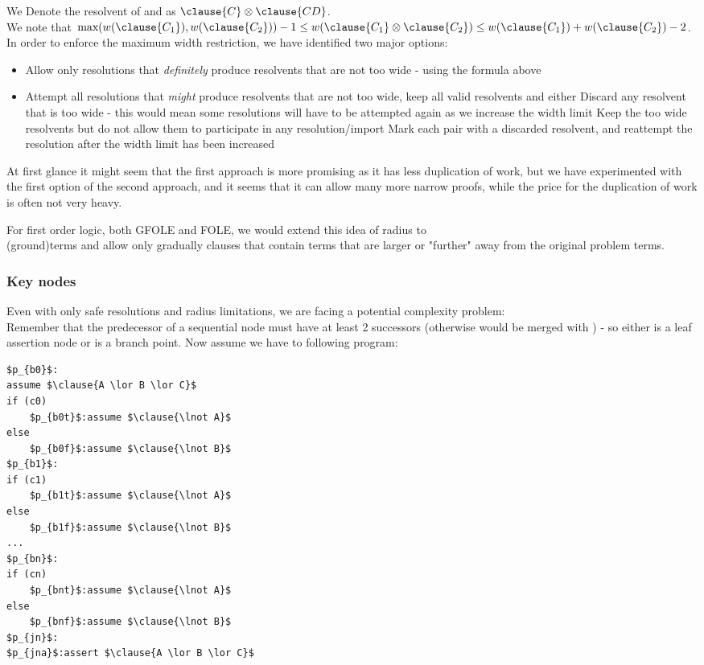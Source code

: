 \noindent
We Denote the resolvent of  and  as $\clause{C} \otimes \clause{CD}$. \\
We note that $\textrm{max}(w(\clause{C_1}),w(\clause{C_2}))-1 \leq w(\clause{C_1} \otimes \clause{C_2}) \leq w(\clause{C_1})+w(\clause{C_2})-2$.\\
In order to enforce the maximum width restriction, we have identified two major options:
\begin{itemize}
	\item Allow only resolutions that \emph{definitely} produce resolvents that are not too wide - using the formula above
	\item Attempt all resolutions that \emph{might} produce resolvents that are not too wide, keep all valid resolvents and either
		\subitem Discard any resolvent that is too wide - this would mean some resolutions will have to be attempted again as we increase the width limit
		\subitem Keep the too wide resolvents but do not allow them to participate in any resolution/import
		\subitem Mark each pair with a discarded resolvent, and reattempt the resolution after the width limit has been increased
\end{itemize}

At first glance it might seem that the first approach is more promising as it has less duplication of work, but we have experimented with the first option of the second approach, and it seems that it can allow many more narrow proofs, while the price for the duplication of work is often not very heavy.

For first order logic, both GFOLE and FOLE, we would extend this idea of radius to \\
(ground)terms and allow only gradually clauses that contain terms that are larger or "further" away from the original problem terms.

\subsubsection{Key nodes}
Even with only safe resolutions and radius limitations, we are facing a potential complexity problem:\\
Remember that the predecessor  of a sequential node  must have at least 2 successors (otherwise  would be merged with ) - so either  is a leaf assertion node or  is a branch point.
Now assume we have to following program:
\begin{lstlisting}[mathescape]
$p_{b0}$: 
assume $\clause{A \lor B \lor C}$
if (c0)
	$p_{b0t}$:assume $\clause{\lnot A}$
else
	$p_{b0f}$:assume $\clause{\lnot B}$
$p_{b1}$: 
if (c1)
	$p_{b1t}$:assume $\clause{\lnot A}$
else
	$p_{b1f}$:assume $\clause{\lnot B}$
...
$p_{bn}$: 
if (cn)
	$p_{bnt}$:assume $\clause{\lnot A}$
else
	$p_{bnf}$:assume $\clause{\lnot B}$
$p_{jn}$: 
$p_{jna}$:assert $\clause{A \lor B \lor C}$ 
\end{lstlisting}

